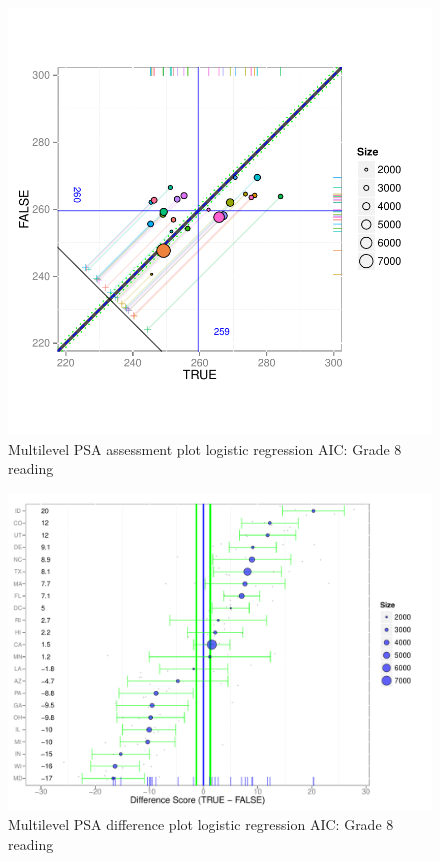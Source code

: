 \begin{figure}[h!]
\begin{center}
\includegraphics[width=\textwidth]{../Figures2009/g8read-mlpsa-lrAIC-circ.pdf}
\caption{Multilevel PSA assessment plot logistic regression AIC: Grade 8 reading}
\end{center}
\end{figure}

\begin{figure}[h!]
\begin{center}
\includegraphics[width=\textwidth]{../Figures2009/g8read-mlpsa-lrAIC-diff.pdf}
\caption{Multilevel PSA difference plot logistic regression AIC: Grade 8 reading}
\end{center}
\end{figure}

